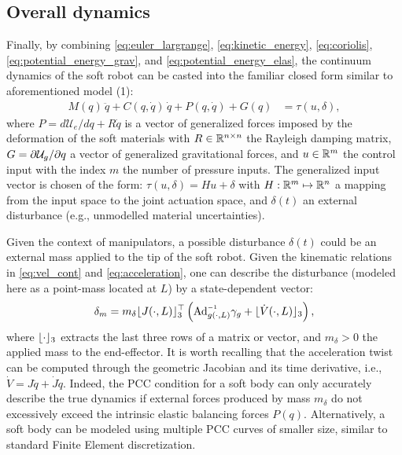 {\subsection*{Overall dynamics}
\noindent Finally, by combining \eqref{eq:euler_largrange}, \eqref{eq:kinetic_energy}, \eqref{eq:coriolis}, \eqref{eq:potential_energy_grav}, and \eqref{eq:potential_energy_elas}, the continuum dynamics of the soft robot can be casted into the familiar closed form \cite{Santina2020Pcc,Boyer2021,Renda2018,Godage2016} similar to aforementioned model (1):
%
\begin{align}
M({q})\,\ddot{{q}} + {C}({q},\dot{{q}})\,\dot{{q}} + P({q},\dot{q}) + G({q}) & = \tau(u,\delta), \label{eq:dynamic_model}
\end{align}
%
\noindent where $P = d \mathcal{U}_e/d q + R\dot{q}$ is a vector of generalized forces imposed by the deformation of the soft materials with $R \in \mathbb{R}^{n\times n}$ the Rayleigh damping matrix, $G = \partial \mathcal{U}_g/\partial q$ a vector of generalized gravitational forces, and $u \in \mathbb{R}^m$ the control input with the index $m$ the number of pressure inputs. The generalized input vector is chosen of the form: $\tau(u,\delta) = H u + \delta$ with $H: \mathbb{R}^m \mapsto \mathbb{R}^n$ a mapping from the input space to the joint actuation space, and $\delta(t)$ an external disturbance (e.g., unmodelled material uncertainties).
%
\begin{remark}
Given the context of manipulators, a possible disturbance $\delta(t)$ could be an external mass applied to the tip of the soft robot. Given the kinematic relations in \eqref{eq:vel_cont} and \eqref{eq:acceleration}, one can describe the disturbance (modeled here as a point-mass located at $L$) by a state-dependent vector:
%
\begin{equation}
\delta_m = m_\delta \floor{J(\cdot,L)}_3^\top\left({\normalfont \Ad}_{g(\cdot,L)}\inv\gamma_g + \floor{\dot{V}(\cdot,L)}_3 \right),
\label{eq:delta_payload}
\end{equation}
%
where $\lfloor\cdot\rfloor_3$ extracts the last three rows of a matrix or vector, and $m_\delta > 0$ the applied mass to the end-effector. It is worth recalling that the acceleration twist can be computed through the geometric Jacobian and its time derivative, i.e., $\dot{V} = J\ddot{q} + \dot{J}\dot{q}$. Indeed, the PCC condition for a soft body can only accurately describe the true dynamics if external forces produced by mass $m_\delta$ do not excessively exceed the intrinsic elastic balancing forces $P(q)$. Alternatively, a soft body can be modeled using multiple PCC curves of smaller size, similar to standard Finite Element discretization.
\end{remark}

}
